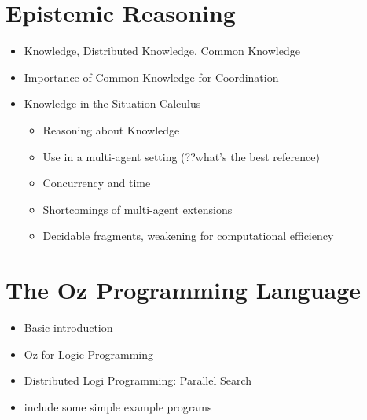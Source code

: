 \section{Epistemic Reasoning}

\begin{itemize}
\item Knowledge, Distributed Knowledge, Common Knowledge \cite{halpern90knowledge_distrib,fagin95}
\item Importance of Common Knowledge for Coordination
\item Knowledge in the Situation Calculus
  \begin{itemize}
  \item Reasoning about Knowledge \cite{moore80know_act,scherl03sc_knowledge}
  \item Use in a multi-agent setting (??what's the best reference)
  \item Concurrency and time \cite{scherl03conc_knowledge}
  \item Shortcomings of multi-agent extensions
  \item Decidable fragments, weakening for computational efficiency
  \end{itemize}
\end{itemize}

\section{The Oz Programming Language}

\begin{itemize}
\item Basic introduction \cite{vanroy99mozart}
\item Oz for Logic Programming \cite{vanroy03mozart_logic}
\item Distributed Logi Programming: Parallel Search \cite{schulte00oz_parallel}
\item include some simple example programs
\end{itemize}

